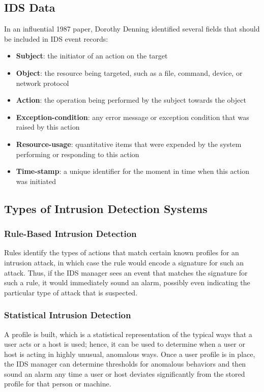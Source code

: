 \subsection{IDS Data} 
In an influential 1987 paper, Dorothy Denning identified several fields that should be included in IDS event records:
\begin{itemize}
\item \textbf{Subject}: the initiator of an action on the target
\item \textbf{Object}: the resource being targeted, such as a file, command, device, or network protocol
\item \textbf{Action}: the operation being performed by the subject towards the object
\item \textbf{Exception-condition}: any error message or exception condition that was raised by this action
\item \textbf{Resource-usage}: quantitative items that were expended by the system performing or responding to this action
\item \textbf{Time-stamp}: a unique identifier for the moment in time when this action was initiated
\end{itemize}
\subsection{Types of Intrusion Detection Systems} 
\subsubsection{Rule-Based Intrusion Detection} 
Rules identify the types of actions that match certain known profiles for an intrusion attack, in which case the rule would encode a signature for such an attack. Thus, if the IDS manager sees an event that matches the signature for such a rule, it would immediately sound an alarm, possibly even indicating the particular type of attack that is
suspected.
\subsubsection{Statistical Intrusion Detection}
A profile is built, which is a statistical representation of the typical ways that a user acts or a host is used; hence, it can be used to determine when a user or host is acting in highly unusual, anomalous ways.
Once a user profile is in place, the IDS manager can determine thresholds for anomalous behaviors and then sound an alarm any time a user or host deviates significantly from the stored profile for that person or machine.
